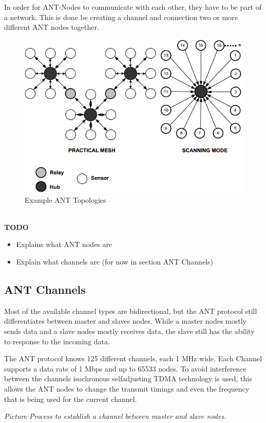 In order for ANT-Nodes to communicate with each other, they have to be part of a network. This is done be creating a channel and connection two or more different ANT nodes together. 
\begin{figure}[h]
	\centering
	\includegraphics[scale=0.7]{./pics/ANTtopo.png}
	\caption{Example ANT Topologies}\label{fig:anttopo}
\end{figure}\\
\textbf{TODO}
\begin{itemize}
	\item{Explains what ANT nodes are}
	\item{Explain what channels are (for now in section ANT Channels)}
\end{itemize}

\subsection{ANT Channels}
Most of the available channel types are bidirectional, but the ANT protocol still differentiates between master and slaves nodes. While a master nodes mostly sends data and a slave nodes mostly receives data, the slave still has the ability to response to the incoming data.

The ANT protocol knows 125 different channels, each 1 MHz wide. Each Channel supports a data rate of 1 Mbps and up to 65533 nodes. To avoid interference between the channels isochronous selfadjusting TDMA technology is used, this allows the ANT nodes to change the transmit timings and even the frequency that is being used for the current channel.

\textit{Picture Process to establish a channel between master and slave nodes.}

